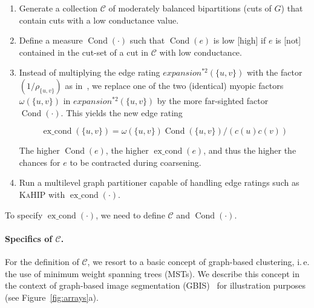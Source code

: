 \documentclass[pdftex]{llncs}
\newcommand{\ie}{i.\,e.\xspace}
\newcommand{\Cond}{\operatorname{Cond}}
\newcommand{\excond}{\operatorname{ex\_cond}}
\newcommand{\kahip}{\textsc{KaHIP}\xspace}
\numberwithin{equation}{section}
\numberwithin{example}{section}
\numberwithin{table}{section}
\begin{document}
\begin{enumerate}
\item Generate a collection $\mathcal{C}$ of moderately balanced
  bipartitions (cuts of $G$) that contain cuts with a low conductance
  value.
\item Define a measure $\Cond(\cdot)$ such that $\Cond(e)$ is low
  [high] if $e$ is [not] contained in the cut-set of a cut in
  $\mathcal{C}$ with low conductance.
\item Instead of multiplying the edge rating $expansion^{*2}(\{u,
  v\})$ with the factor $(1/\rho_{\{u, v\}})$ as in~\cite{Safro2012a},
  we replace one of the two (identical) myopic factors $\omega(\{u,
  v\})$ in $expansion^{*2}(\{u, v\})$ by the more far-sighted factor
  $\Cond(\cdot)$. This yields the new edge rating

  \begin{equation}
  \label{eq:excond}
  \excond(\{u, v\}) = \omega(\{u, v\}) \Cond(\{u, v\}) / (c(u) c(v))   
  \end{equation}

  The higher $\Cond(e)$, the higher $\excond(e)$, and thus the higher
  the chances for $e$ to be contracted during coarsening.
\item Run a multilevel graph partitioner capable of handling edge ratings
such as \kahip with $\excond(\cdot)$.
\end{enumerate}

\noindent To specify $\excond(\cdot)$, we need to define $\mathcal{C}$
and $\Cond(\cdot)$.

\paragraph{Specifics of $\mathcal{C}$.}
For the definition of $\mathcal{C}$, we resort to a
basic concept of graph-based clustering, \ie the use of minimum weight
spanning trees (MSTs). We describe this concept in the context of
graph-based image segmentation
(GBIS)~\cite{Felzenszwalb2004a,Wassenberg2009a} for illustration
purposes (see Figure~\ref{fig:arrays}a).
\end{document}
